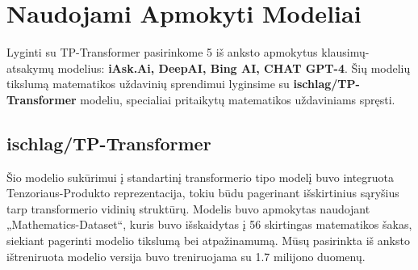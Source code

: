 \documentclass[conference]{IEEEtran}
\begin{document}









\section{Naudojami Apmokyti Modeliai}
Lyginti su TP-Transformer pasirinkome 5 iš anksto apmokytus klausimų-atsakymų modelius: \textbf{
iAsk.Ai, DeepAI, Bing AI, CHAT GPT-4}. Šių modelių tikslumą matematikos uždavinių sprendimui lyginsime su \textbf{ischlag/TP-Transformer} modeliu,
specialiai pritaikytų matematikos uždaviniams spręsti.

\subsection{ischlag/TP-Transformer}
Šio modelio sukūrimui į standartinį transformerio tipo modelį buvo integruota Tenzoriaus-Produkto
reprezentacija, tokiu būdu pagerinant išskirtinius sąryšius tarp transformerio vidinių struktūrų. Modelis buvo apmokytas
naudojant „Mathematics-Dataset“, kuris buvo išskaidytas į 56 skirtingas matematikos šakas, siekiant
pagerinti modelio tikslumą bei atpažinamumą. Mūsų pasirinkta iš anksto ištreniruota modelio 
versija buvo treniruojama su 1.7 milijono duomenų.
\end{document}
